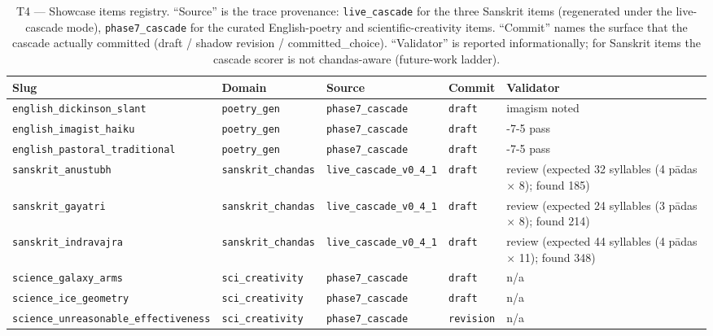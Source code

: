 \begin{table}[ht]
\centering
\caption{T4 --- Showcase items registry. ``Source'' is the trace provenance: \texttt{live\_cascade} for the three Sanskrit items (regenerated under the live-cascade mode), \texttt{phase7\_cascade} for the curated English-poetry and scientific-creativity items. ``Commit'' names the surface that the cascade actually committed (draft / shadow revision / committed\_choice). ``Validator'' is reported informationally; for Sanskrit items the cascade scorer is not chandas-aware (future-work ladder).}
\label{tab:showcase_registry}
\renewcommand{\arraystretch}{1.15}
\sloppy
\footnotesize
\begin{tabularx}{\linewidth}{@{}>{\raggedright\arraybackslash}p{5.2cm}>{\raggedright\arraybackslash}p{2.4cm}>{\raggedright\arraybackslash}p{2.6cm}>{\raggedright\arraybackslash}p{1.8cm}>{\raggedright\arraybackslash}X@{}}
\toprule
Slug & Domain & Source & Commit & Validator \\
\midrule
  \texttt{english\_\allowbreak{}dickinson\_\allowbreak{}slant} & \texttt{poetry\_\allowbreak{}gen} & \texttt{phase7\_\allowbreak{}cascade} & \texttt{draft} & imagism noted \\
  \texttt{english\_\allowbreak{}imagist\_\allowbreak{}haiku} & \texttt{poetry\_\allowbreak{}gen} & \texttt{phase7\_\allowbreak{}cascade} & \texttt{draft} & 5-7-5 pass \\
  \texttt{english\_\allowbreak{}pastoral\_\allowbreak{}traditional} & \texttt{poetry\_\allowbreak{}gen} & \texttt{phase7\_\allowbreak{}cascade} & \texttt{draft} & 5-7-5 pass \\
  \texttt{sanskrit\_\allowbreak{}anustubh} & \texttt{sanskrit\_\allowbreak{}chandas} & \texttt{live\_\allowbreak{}cascade\_\allowbreak{}v0\_\allowbreak{}4\_\allowbreak{}1} & \texttt{draft} & review (expected 32 syllables (4 p\=adas $\times$ 8); found 185) \\
  \texttt{sanskrit\_\allowbreak{}gayatri} & \texttt{sanskrit\_\allowbreak{}chandas} & \texttt{live\_\allowbreak{}cascade\_\allowbreak{}v0\_\allowbreak{}4\_\allowbreak{}1} & \texttt{draft} & review (expected 24 syllables (3 p\=adas $\times$ 8); found 214) \\
  \texttt{sanskrit\_\allowbreak{}indravajra} & \texttt{sanskrit\_\allowbreak{}chandas} & \texttt{live\_\allowbreak{}cascade\_\allowbreak{}v0\_\allowbreak{}4\_\allowbreak{}1} & \texttt{draft} & review (expected 44 syllables (4 p\=adas $\times$ 11); found 348) \\
  \texttt{science\_\allowbreak{}galaxy\_\allowbreak{}arms} & \texttt{sci\_\allowbreak{}creativity} & \texttt{phase7\_\allowbreak{}cascade} & \texttt{draft} & n/a \\
  \texttt{science\_\allowbreak{}ice\_\allowbreak{}geometry} & \texttt{sci\_\allowbreak{}creativity} & \texttt{phase7\_\allowbreak{}cascade} & \texttt{draft} & n/a \\
  \texttt{science\_\allowbreak{}unreasonable\_\allowbreak{}effectiveness} & \texttt{sci\_\allowbreak{}creativity} & \texttt{phase7\_\allowbreak{}cascade} & \texttt{revision} & n/a \\
\bottomrule
\end{tabularx}
\end{table}
